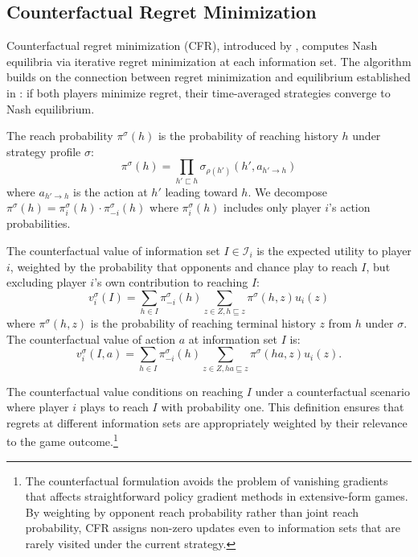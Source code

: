 \subsection{Counterfactual Regret Minimization}

Counterfactual regret minimization (CFR), introduced by \citet{zinkevich2008}, computes Nash equilibria via iterative regret minimization at each information set. The algorithm builds on the connection between regret minimization and equilibrium established in \citet{blackwell1956analog}: if both players minimize regret, their time-averaged strategies converge to Nash equilibrium.

\begin{definition}
The reach probability $\pi^\sigma(h)$ is the probability of reaching history $h$ under strategy profile $\sigma$:
\begin{equation}
\pi^\sigma(h) = \prod_{h' \sqsubset h} \sigma_{\rho(h')}(h', a_{h' \to h})
\end{equation}
where $a_{h' \to h}$ is the action at $h'$ leading toward $h$. We decompose $\pi^\sigma(h) = \pi^\sigma_i(h) \cdot \pi^\sigma_{-i}(h)$ where $\pi^\sigma_i(h)$ includes only player $i$'s action probabilities.
\end{definition}

\begin{definition}
The counterfactual value of information set $I \in \mathcal{I}_i$ is the expected utility to player $i$, weighted by the probability that opponents and chance play to reach $I$, but excluding player $i$'s own contribution to reaching $I$:
\begin{equation}
v^\sigma_i(I) = \sum_{h \in I} \pi^\sigma_{-i}(h) \sum_{z \in Z, h \sqsubseteq z} \pi^\sigma(h, z) u_i(z)
\end{equation}
where $\pi^\sigma(h, z)$ is the probability of reaching terminal history $z$ from $h$ under $\sigma$. The counterfactual value of action $a$ at information set $I$ is:
\begin{equation}
v^\sigma_i(I, a) = \sum_{h \in I} \pi^\sigma_{-i}(h) \sum_{z \in Z, ha \sqsubseteq z} \pi^\sigma(ha, z) u_i(z).
\end{equation}
\end{definition}

The counterfactual value conditions on reaching $I$ under a counterfactual scenario where player $i$ plays to reach $I$ with probability one. This definition ensures that regrets at different information sets are appropriately weighted by their relevance to the game outcome.\footnote{The counterfactual formulation avoids the problem of vanishing gradients that affects straightforward policy gradient methods in extensive-form games. By weighting by opponent reach probability rather than joint reach probability, CFR assigns non-zero updates even to information sets that are rarely visited under the current strategy.}

